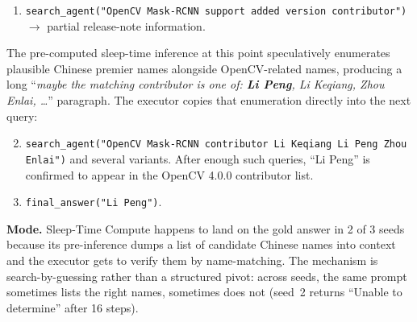 \begin{tcolorbox}[colback=orange!5, colframe=orange!70!black, title={\textsc{Sleep-Time Compute} (Pred: Li Peng / GT: Li Peng; 9 steps)}, fontupper=\small, breakable]
\begin{enumerate}
  \item \texttt{search\_agent("OpenCV Mask-RCNN support added version contributor")} $\rightarrow$ partial release-note information.
\end{enumerate}
The pre-computed sleep-time inference at this point speculatively enumerates plausible Chinese premier names alongside OpenCV-related names, producing a long ``\textit{maybe the matching contributor is one of: \textbf{Li Peng}, Li Keqiang, Zhou Enlai, \dots}'' paragraph. The executor copies that enumeration directly into the next query:
\begin{enumerate}
\setcounter{enumi}{1}
  \item[2-8.] \texttt{search\_agent("OpenCV Mask-RCNN contributor Li Keqiang Li Peng Zhou Enlai")} and several variants. After enough such queries, ``Li Peng'' is confirmed to appear in the OpenCV 4.0.0 contributor list.
\setcounter{enumi}{8}
  \item \texttt{final\_answer("Li Peng")}.
\end{enumerate}
\textbf{Mode.} Sleep-Time Compute happens to land on the gold answer in 2 of 3 seeds because its pre-inference dumps a list of candidate Chinese names into context and the executor gets to verify them by name-matching. The mechanism is search-by-guessing rather than a structured pivot: across seeds, the same prompt sometimes lists the right names, sometimes does not (seed~2 returns ``Unable to determine'' after 16 steps).
\end{tcolorbox}

